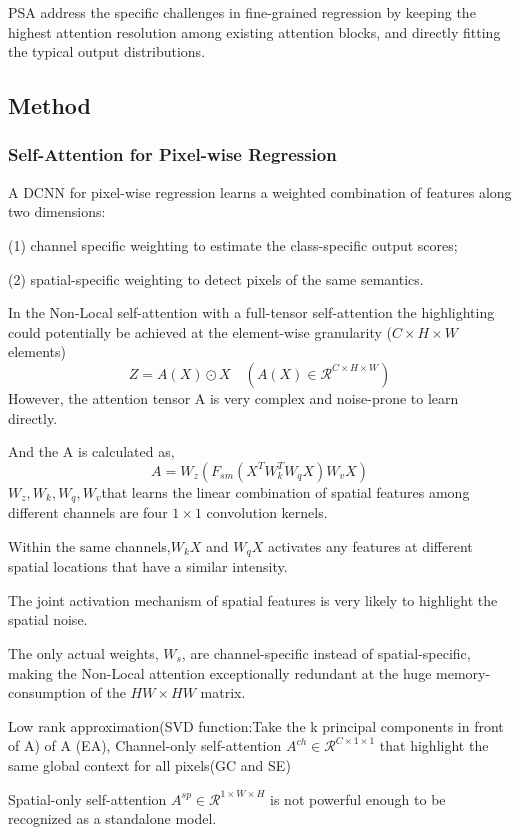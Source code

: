 \documentclass[11pt]{article}
\begin{document}
PSA address the specific challenges in fine-grained regression by keeping the highest attention resolution among existing attention blocks, and directly fitting the typical output distributions.

\subsection{Method}
\subsubsection{Self-Attention for Pixel-wise Regression}
A DCNN for pixel-wise regression learns a weighted combination of features along two dimensions: 

\noindent(1) channel specific weighting to estimate the class-specific output scores;

\noindent(2) spatial-specific weighting to detect pixels of the same semantics.

In the Non-Local self-attention with a full-tensor self-attention the highlighting could potentially
be achieved at the element-wise granularity ($C\times H\times W$ elements)
$$Z = A(X)\odot X \quad (A(X) \in \mathcal{R}^{C\times H\times W})$$
However, the attention tensor A is very complex and noise-prone to learn directly.

And the A is calculated as,
$$A = W_z(F_{sm}(X^TW_k^TW_qX)W_vX)$$
$W_z,W_k,W_q,W_v$that learns the linear combination of spatial features among different channels are four $1\times1$ convolution kernels.

Within the same channels,$W_kX$ and $W_qX$ activates any features at different spatial locations that have a similar intensity.

The joint activation mechanism of spatial features is very likely to highlight the spatial noise.

The only actual weights, $W_s$, are channel-specific instead of spatial-specific, making the Non-Local attention exceptionally redundant at the huge memory-consumption of the $HW \times HW$ matrix.

Low rank approximation(SVD function:Take the k principal components in front of A) of A (EA), Channel-only self-attention $A^{ch}\in \mathcal{R}^{C\times1\times1}$ that highlight the same global context for all pixels(GC and SE)

Spatial-only self-attention $A^{sp}\in \mathcal{R}^{1\times W\times H}$  is not powerful enough to be recognized as a standalone model.
\end{document}
